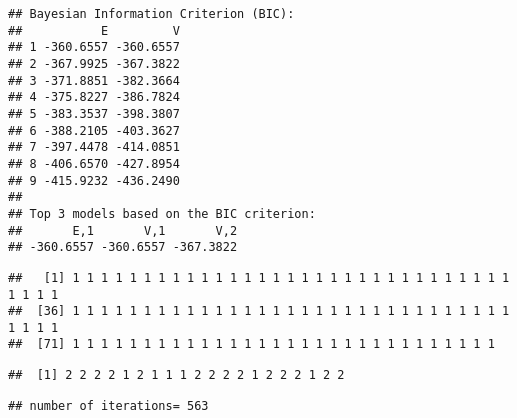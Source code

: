\documentclass[]{article}
\newenvironment{Shaded}{\begin{snugshade}}{\end{snugshade}}
\newcommand{\DataTypeTok}[1]{\textcolor[rgb]{0.13,0.29,0.53}{#1}}
\newcommand{\DecValTok}[1]{\textcolor[rgb]{0.00,0.00,0.81}{#1}}
\newcommand{\FloatTok}[1]{\textcolor[rgb]{0.00,0.00,0.81}{#1}}
\newcommand{\KeywordTok}[1]{\textcolor[rgb]{0.13,0.29,0.53}{\textbf{#1}}}
\newcommand{\NormalTok}[1]{#1}
\newcommand{\OperatorTok}[1]{\textcolor[rgb]{0.81,0.36,0.00}{\textbf{#1}}}
\newcommand{\StringTok}[1]{\textcolor[rgb]{0.31,0.60,0.02}{#1}}
\begin{document}
\begin{verbatim}
## Bayesian Information Criterion (BIC): 
##           E         V
## 1 -360.6557 -360.6557
## 2 -367.9925 -367.3822
## 3 -371.8851 -382.3664
## 4 -375.8227 -386.7824
## 5 -383.3537 -398.3807
## 6 -388.2105 -403.3627
## 7 -397.4478 -414.0851
## 8 -406.6570 -427.8954
## 9 -415.9232 -436.2490
## 
## Top 3 models based on the BIC criterion: 
##       E,1       V,1       V,2 
## -360.6557 -360.6557 -367.3822
\end{verbatim}

\begin{Shaded}
\end{Shaded}

\begin{verbatim}
##   [1] 1 1 1 1 1 1 1 1 1 1 1 1 1 1 1 1 1 1 1 1 1 1 1 1 1 1 1 1 1 1 1 1 1 1 1
##  [36] 1 1 1 1 1 1 1 1 1 1 1 1 1 1 1 1 1 1 1 1 1 1 1 1 1 1 1 1 1 1 1 1 1 1 1
##  [71] 1 1 1 1 1 1 1 1 1 1 1 1 1 1 1 1 1 1 1 1 1 1 1 1 1 1 1 1 1 1
\end{verbatim}

\begin{Shaded}
\end{Shaded}

\begin{verbatim}
##  [1] 2 2 2 2 1 2 1 1 1 2 2 2 2 1 2 2 2 1 2 2
\end{verbatim}

\begin{Shaded}
\end{Shaded}

\begin{verbatim}
## number of iterations= 563
\end{verbatim}
\end{document}
